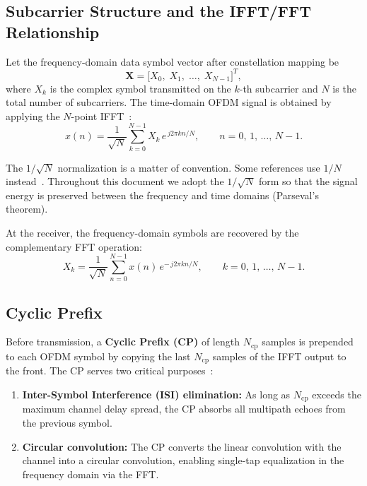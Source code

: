 \subsection{Subcarrier Structure and the IFFT/FFT Relationship}

Let the frequency-domain data symbol vector after constellation mapping be
\begin{equation}
    \bm{X} = \bigl[X_0,\; X_1,\; \dots,\; X_{N-1}\bigr]^T,
    \label{eq:freq_domain_vector}
\end{equation}
where $X_k$ is the complex symbol transmitted on the $k$-th subcarrier and
$N$ is the total number of subcarriers.  The time-domain OFDM signal is
obtained by applying the $N$-point IFFT~\cite{da2024survey,ali2016new}:
\begin{equation}
    x(n) = \frac{1}{\sqrt{N}} \sum_{k=0}^{N-1} X_k \, e^{\,j2\pi kn/N},
    \qquad n = 0,\, 1,\, \dots,\, N-1.
    \label{eq:ofdm_signal}
\end{equation}

\begin{keyinsight}
    The $1/\!\sqrt{N}$ normalization is a matter of convention.
    Some references use $1/N$ instead~\cite{ali2016new}.
    Throughout this document we adopt the $1/\!\sqrt{N}$ form
    so that the signal energy is preserved between the frequency and
    time domains (Parseval's theorem).
\end{keyinsight}

At the receiver, the frequency-domain symbols are recovered by the complementary
FFT operation:
\begin{equation}
    X_k = \frac{1}{\sqrt{N}} \sum_{n=0}^{N-1} x(n) \, e^{-\,j2\pi kn/N},
    \qquad k = 0,\, 1,\, \dots,\, N-1.
    \label{eq:fft_recovery}
\end{equation}

\subsection{Cyclic Prefix}

Before transmission, a \textbf{Cyclic Prefix (CP)} of length $N_{\mathrm{cp}}$
samples is prepended to each OFDM symbol by copying the last
$N_{\mathrm{cp}}$ samples of the IFFT output to the front.  The CP serves two
critical purposes~\cite{da2024survey}:
\begin{enumerate}
    \item \textbf{Inter-Symbol Interference (ISI) elimination:}
          As long as $N_{\mathrm{cp}}$ exceeds the maximum channel delay
          spread, the CP absorbs all multipath echoes from the previous symbol.
    \item \textbf{Circular convolution:}
          The CP converts the linear convolution with the channel into a
          circular convolution, enabling single-tap equalization in the
          frequency domain via the FFT.
\end{enumerate}

